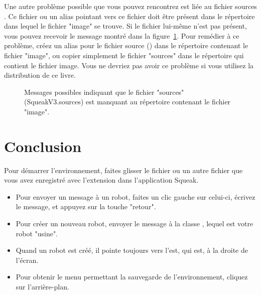 \documentclass[a4paper,10pt,twoside]{book}
\begin{document}
Une autre probl\`eme possible que vous pouvez  rencontrez est li\'ee au fichier sources . Ce fichier ou un alias pointant vers ce fichier doit \^etre pr\'esent dans le r\'epertoire dans lequel le fichier "image" se trouve. Si le fichier lui-m\^eme n'est pas pr\'esent, vous pouvez recevoir le message montr\'e dans la figure~\ref{fig:sourcesMissing}. 
Pour rem\'edier \`a ce probl\`eme, cr\'eez un alias pour le fichier source () dans le r\'epertoire contenant le fichier "image", ou copier simplement le fichier "sources" dans le r\'epertoire qui contient le fichier image. Vous ne devriez pas avoir ce probl\`eme si vous utilisez la distribution de ce livre. 

\begin{figure}[!h]%
\caption{Messages possibles indiquant que le fichier "sources" (SqueakV3.sources) est manquant au r\'epertoire contenant le fichier "image".\label{fig:sourcesMissing}}
\end{figure}


\section{Conclusion}
Pour d\'emarrer l'environnement, faites glisser le fichier  ou un autre fichier que vous avez enregistr\'e avec l'extension  dans l'application Squeak. 

\begin{itemize}
\item Pour envoyer un message \`a un robot, faites un clic gauche sur celui-ci, \'ecrivez le message, et appuyez sur la touche "retour". 
\item Pour cr\'eer un nouveau robot, envoyer le message  \`a la classe , lequel est votre robot "usine".
\item Quand un robot est cr\'e\'e, il pointe toujours vers l'est, qui est, \`a la droite de l'\'ecran. 
\item Pour obtenir le menu permettant la sauvegarde de l'environnement, cliquez sur l'arri\`ere-plan.
\end{itemize}



\ifx\wholebook\relax\else
    
\end{document}
